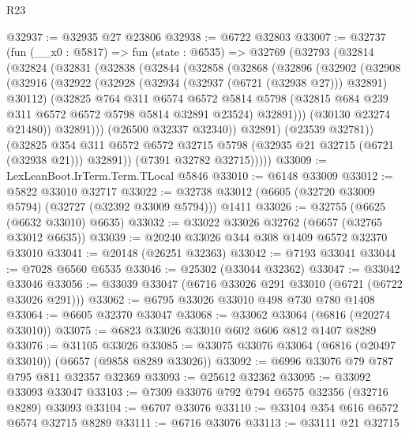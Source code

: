 \begin{lexlean}{R23}
\begin{coremodule}
@32937 := @32935 @27 @23806
@32938 := @6722 @32803
@33007 := @32737
    (fun (__x0 : @5817) =>
    fun (state : @6535) =>
    @32769
      (@32793
        (@32814
          (@32824
            (@32831
              (@32838
                (@32844
                  (@32858
                    (@32868
                      (@32896
                        (@32902
                          (@32908
                            (@32916
                              (@32922
                                (@32928 (@32934 (@32937 (@6721 (@32938 @27))) @32891) @30112)
                                (@32825
                                  @764
                                  @311
                                  @6574
                                  @6572
                                  @5814
                                  @5798
                                  (@32815 @684 @239 @311 @6572 @6572 @5798 @5814 @32891 @23524)
                                  @32891)))
                            (@30130 @23274 @21480))
                          @32891)))
                    (@26500 @32337 @32340))
                  @32891)
                (@23539 @32781))
              (@32825
                @354
                @311
                @6572
                @6572
                @32715
                @5798
                (@32935 @21 @32715 (@6721 (@32938 @21)))
                @32891))
            (@7391 @32782 @32715)))))
@33009 := LexLeanBoot.IrTerm.Term.TLocal @5846
@33010 := @6148 @33009
@33012 := @5822 @33010 @32717
@33022 := @32738 @33012 (@6605 (@32720 @33009 @5794) (@32727 (@32392 @33009 @5794))) @1411
@33026 := @32755 (@6625 (@6632 @33010) @6635)
@33032 := @33022 @33026 @32762 (@6657 (@32765 @33012 @6635))
@33039 := @20240 @33026 @344 @308 @1409 @6572 @32370 @33010
@33041 := @20148 (@26251 @32363)
@33042 := @7193 @33041
@33044 := @7028 @6560 @6535
@33046 := @25302 (@33044 @32362)
@33047 := @33042 @33046
@33056 := @33039 @33047 (@6716 @33026 @291 @33010 (@6721 (@6722 @33026 @291)))
@33062 := @6795 @33026 @33010 @498 @730 @780 @1408
@33064 := @6605 @32370 @33047
@33068 := @33062 @33064 (@6816 (@20274 @33010))
@33075 := @6823 @33026 @33010 @602 @606 @812 @1407 @8289
@33076 := @31105 @33026
@33085 := @33075 @33076 @33064 (@6816 (@20497 @33010)) (@6657 (@9858 @8289 @33026))
@33092 := @6996 @33076 @79 @787 @795 @811 @32357 @32369
@33093 := @25612 @32362
@33095 := @33092 @33093 @33047
@33103 := @7309 @33076 @792 @794 @6575 @32356 (@32716 @8289) @33093
@33104 := @6707 @33076
@33110 := @33104 @354 @616 @6572 @6574 @32715 @8289
@33111 := @6716 @33076
@33113 := @33111 @21 @32715

\end{coremodule}
\end{lexlean}
